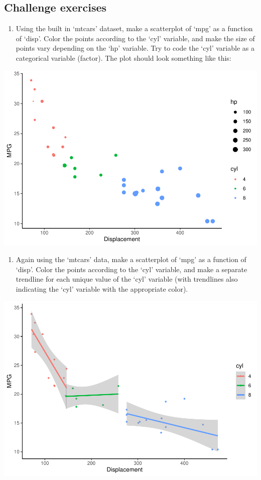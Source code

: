 \documentclass[
]{article}
\providecommand{\tightlist}{%
  \setlength{\itemsep}{0pt}\setlength{\parskip}{0pt}}
\begin{document}
\hypertarget{challenge-exercises}{%
\subsection{Challenge exercises}\label{challenge-exercises}}

\begin{enumerate}
\def\labelenumi{\arabic{enumi}.}
\tightlist
\item
  Using the built in `mtcars' dataset, make a scatterplot of `mpg' as a
  function of `disp'. Color the points according to the `cyl' variable,
  and make the size of points vary depending on the `hp' variable. Try
  to code the `cyl' variable as a categorical variable (factor). The
  plot should look something like this:
\end{enumerate}

\includegraphics{module1_3_files/figure-latex/unnamed-chunk-18-1.pdf}

\begin{enumerate}
\def\labelenumi{\arabic{enumi}.}
\setcounter{enumi}{1}
\tightlist
\item
  Again using the `mtcars' data, make a scatterplot of `mpg' as a
  function of `disp'. Color the points according to the `cyl' variable,
  and make a separate trendline for each unique value of the `cyl'
  variable (with trendlines also indicating the `cyl' variable with the
  appropriate color).
\end{enumerate}

\includegraphics{module1_3_files/figure-latex/unnamed-chunk-19-1.pdf}
\end{document}
